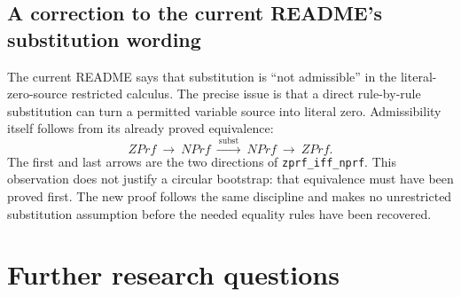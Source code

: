 \documentclass[11pt,letterpaper]{article}
\theoremstyle{definition}\newtheorem{definition}[theorem]{Definition}
\theoremstyle{remark}\newtheorem{remark}[theorem]{Remark}
\newcommand{\file}[1]{{\small\nolinkurl{#1}}}
\begin{document}
\subsection{A correction to the current README's substitution wording}

The current README says that substitution is ``not admissible'' in the
literal-zero-source restricted calculus. The precise issue is that a direct
rule-by-rule substitution can turn a permitted variable source into literal
zero. Admissibility itself follows from its already proved equivalence:
\[
 ZPrf\ \longrightarrow\ NPrf\ \xrightarrow{\ \mathrm{subst}\ }\
 NPrf\ \longrightarrow\ ZPrf.
\]
The first and last arrows are the two directions of
\file{zprf_iff_nprf}. This observation does not justify a circular bootstrap:
that equivalence must have been proved first. The new proof follows the same
discipline and makes no unrestricted substitution assumption before the
needed equality rules have been recovered.

\section{Further research questions}
\end{document}
